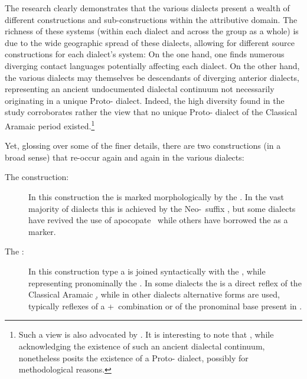 The research clearly demonstrates that the various  dialects present a wealth of different constructions and sub-constructions within the attributive domain. The richness of these systems (within each dialect and across the group as a whole) is due to the wide geographic spread of these dialects, allowing for different source constructions for each dialect's system: On the one hand, one finds numerous diverging contact languages potentially affecting  each dialect. On the other hand, the various dialects may themselves be descendants of diverging anterior dialects, representing an ancient undocumented dialectal continuum not necessarily originating in a unique Proto- dialect. Indeed, the high diversity found in the study corroborates rather the view that no unique Proto- dialect of the Classical Aramaic period existed.\footnote{Such a view is also advocated by \citet{KimStammbaum}. It is interesting to note that \citet[558f.]{Hoberman1988history}, while acknowledging the existence of such an ancient dialectal continuum, nonetheless posits the existence of a Proto- dialect, possibly for methodological reasons.}

Yet, glossing over some of the finer details, there are two constructions (in a broad sense) that re-occur again and again in the various dialects:

\begin{description}

\item[The  construction:] In this construction the \prim is marked morphologically by the \cst*. In the vast majority of dialects this is achieved by the Neo-\cst\ suffix \ed, but some dialects have revived the use of apocopate \cst\ while others have borrowed the  \ez* as a \cst* marker. 

\item[The :] In this construction type a \lnk* is joined syntactically  with the \secn, while representing pronominally the \prim. In some dialects the \lnk* is a direct reflex of the Classical Aramaic \lnk* \d, while in other dialects alternative \lnk* forms are used, typically reflexes of a \dem+\lnk\ combination or of the pronominal base  present in \JBA. 

\end{description}

